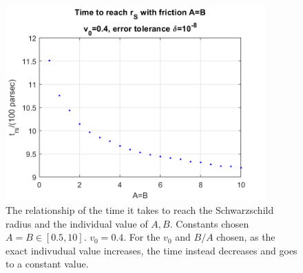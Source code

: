 \documentclass[12pt, graphicx]{article}
\begin{document}
\begin{figure}[ht]
\centering
\includegraphics[width = 100mm]{trs_AB.png}
\caption{The relationship of the time it takes to reach the Schwarzschild radius and the individual value of $A, B$. Constants chosen $A=B\in[0.5, 10]$. $v_0=0.4$. For the $v_0$ and $B/A$ chosen, as the exact indivudual value increases, the time instead decreases and goes to a constant value.}
\label{fig:trsAB}
\end{figure}
\end{document}
